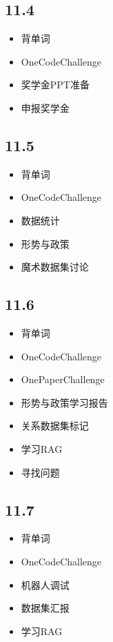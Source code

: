 \documentclass[UTF8]{ctexart}
\begin{document}
\subsection*{11.4}
\begin{itemize}
    \item 背单词
    \item OneCodeChallenge
    \item 奖学金PPT准备
    \item 申报奖学金
\end{itemize}

\subsection*{11.5}
\begin{itemize}
    \item 背单词
    \item OneCodeChallenge
    \item 数据统计
    \item 形势与政策
    \item 魔术数据集讨论
\end{itemize}

\subsection*{11.6}
\begin{itemize}
    \item 背单词
    \item OneCodeChallenge
    \item OnePaperChallenge
    \item 形势与政策学习报告
    \item 关系数据集标记
    \item 学习RAG
    \item 寻找问题
\end{itemize}

\subsection*{11.7}
\begin{itemize}
    \item 背单词
    \item OneCodeChallenge
    \item 机器人调试
    \item 数据集汇报
    \item 学习RAG
\end{itemize}
\end{document}
